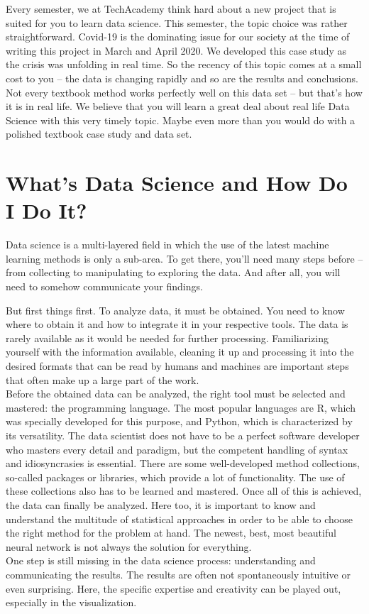 \documentclass[
  11pt,
]{article}
\begin{document}
Every semester, we at TechAcademy think hard about a new project that is suited for you to learn data science. This semester, the topic choice was rather straightforward. Covid-19 is the dominating issue for our society at the time of writing this project in March and April 2020. We developed this case study as the crisis was unfolding in real time. So the recency of this topic comes at a small cost to you -- the data is changing rapidly and so are the results and conclusions. Not every textbook method works perfectly well on this data set -- but that's how it is in real life. We believe that you will learn a great deal about real life Data Science with this very timely topic. Maybe even more than you would do with a polished textbook case study and data set.

\hypertarget{whats-data-science-and-how-do-i-do-it}{%
\section{What's Data Science and How Do I Do It?}\label{whats-data-science-and-how-do-i-do-it}}

Data science is a multi-layered field in which the use of the latest machine learning methods is only a sub-area. To get there, you'll need many steps before -- from collecting to manipulating to exploring the data. And after all, you will need to somehow communicate your findings.

But first things first. To analyze data, it must be obtained. You need to know where to obtain it and how to integrate it in your respective tools. The data is rarely available as it would be needed for further processing. Familiarizing yourself with the information available, cleaning it up and processing it into the desired formats that can be read by humans and machines are important steps that often make up a large part of the work.\\
Before the obtained data can be analyzed, the right tool must be selected and mastered: the programming language. The most popular languages are R, which was specially developed for this purpose, and Python, which is characterized by its versatility. The data scientist does not have to be a perfect software developer who masters every detail and paradigm, but the competent handling of syntax and idiosyncrasies is essential.
There are some well-developed method collections, so-called packages or libraries, which provide a lot of functionality. The use of these collections also has to be learned and mastered.
Once all of this is achieved, the data can finally be analyzed. Here too, it is important to know and understand the multitude of statistical approaches in order to be able to choose the right method for the problem at hand. The newest, best, most beautiful neural network is not always the solution for everything.\\
One step is still missing in the data science process: understanding and communicating the results. The results are often not spontaneously intuitive or even surprising. Here, the specific expertise and creativity can be played out, especially in the visualization.
\end{document}
